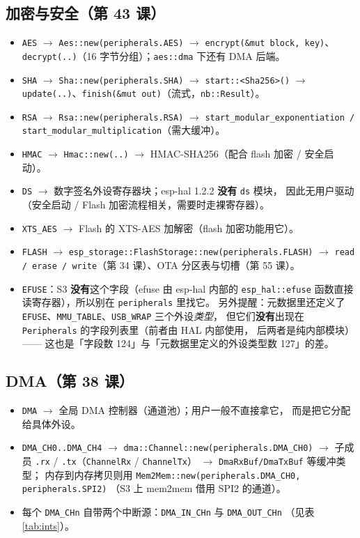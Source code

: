 \documentclass[UTF8,a4paper,11pt,fontset=fandol]{ctexart}
\newcommand{\fld}[1]{\texttt{#1}}
\begin{document}
\subsection{加密与安全（第 43 课）}
\begin{itemize}
  \item \fld{AES} $\rightarrow$ \fld{Aes::new(peripherals.AES)} $\rightarrow$
    \fld{encrypt(\&mut block, key)}、\fld{decrypt(..)}（16 字节分组）；\fld{aes::dma} 下还有 DMA 后端。
  \item \fld{SHA} $\rightarrow$ \fld{Sha::new(peripherals.SHA)}
    $\rightarrow$ \fld{start::<Sha256>()} $\rightarrow$ \fld{update(..)}、\fld{finish(\&mut out)}（流式，\fld{nb::Result}）。
  \item \fld{RSA} $\rightarrow$ \fld{Rsa::new(peripherals.RSA)}
    $\rightarrow$ \fld{start\_modular\_exponentiation / start\_modular\_multiplication}（需大缓冲）。
  \item \fld{HMAC} $\rightarrow$ \fld{Hmac::new(..)} $\rightarrow$ HMAC-SHA256（配合 flash 加密 / 安全启动）。
  \item \fld{DS} $\rightarrow$ 数字签名外设寄存器块；esp-hal 1.2.2 \textbf{没有} \fld{ds} 模块，
    因此无用户驱动（安全启动 / Flash 加密流程相关，需要时走裸寄存器）。
  \item \fld{XTS\_AES} $\rightarrow$ Flash 的 XTS-AES 加解密（flash 加密功能用它）。
  \item \fld{FLASH} $\rightarrow$ \fld{esp\_storage::FlashStorage::new(peripherals.FLASH)}
    $\rightarrow$ \fld{read / erase / write}（第 34 课）、OTA 分区表与切槽（第 55 课）。
  \item \fld{EFUSE}：S3 \textbf{没有}这个字段（efuse 由 esp-hal 内部的 \fld{esp\_hal::efuse}
    函数直接读寄存器），所以别在 \fld{peripherals} 里找它。
    另外提醒：元数据里还定义了 \fld{EFUSE}、\fld{MMU\_TABLE}、\fld{USB\_WRAP} 三个外设\emph{类型}，
    但它们\textbf{没有}出现在 \fld{Peripherals} 的字段列表里（前者由 HAL 内部使用，
    后两者是纯内部模块）—— 这也是「字段数 124」与「元数据里定义的外设类型数 127」的差。
\end{itemize}

\subsection{DMA（第 38 课）}
\begin{itemize}
  \item \fld{DMA} $\rightarrow$ 全局 DMA 控制器（通道池）；用户一般不直接拿它，
    而是把它分配给具体外设。
  \item \fld{DMA\_CH0..DMA\_CH4} $\rightarrow$ \fld{dma::Channel::new(peripherals.DMA\_CH0)}
    $\rightarrow$ 子成员 \fld{.rx} / \fld{.tx}（\fld{ChannelRx} / \fld{ChannelTx}）
    $\rightarrow$ \fld{DmaRxBuf/DmaTxBuf} 等缓冲类型；
    内存到内存拷贝则用 \fld{Mem2Mem::new(peripherals.DMA\_CH0, peripherals.SPI2)}
    （S3 上 mem2mem 借用 SPI2 的通道）。
  \item 每个 \fld{DMA\_CHn} 自带两个中断源：\fld{DMA\_IN\_CHn} 与 \fld{DMA\_OUT\_CHn}
    （见表 \ref{tab:ints}）。
\end{itemize}
\end{document}
